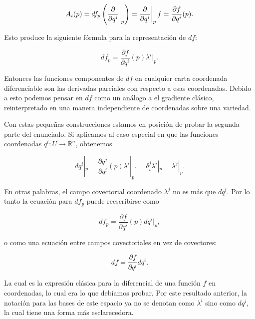 \documentclass[a4paper,10pt]{article}
\numberwithin{equation}{section}
\newcommand{\zerodel}{.\kern-\nulldelimiterspace}
\begin{document}
\begin{equation}
 A_i(p) = df_p\left( \left\zerodel \frac{\partial}{\partial q^i}\right|_p \right) = 
  \left\zerodel \frac{\partial}{\partial q^i}\right|_p f = \frac{\partial f}{\partial q^i}(p).
\end{equation}

Esto produce la siguiente fórmula para la representación de $df$:

\begin{equation}
 df_p = \frac{\partial f}{\partial q^i}(p) \lambda^i|_p.
 \label{eq:diferencial1}
\end{equation}

Entonces las funciones componentes de $df$ en cualquier carta coordenada diferenciable 
son las derivadas parciales con respecto a esas coordenadas. Debido a esto podemos 
pensar en $df$ como un análogo a el gradiente clásico, reinterpretado en una manera 
independiente de coordenadas sobre una variedad.

\vspace{.3cm}

Con estas pequeñas construcciones estamos en posición de probar la segunda parte 
del enunciado. Si aplicamos  al caso especial en que las 
funciones coordenadas $q^i: U \rightarrow \mathbb{R}^n$, obtenemos 

\begin{equation}
 dq^i|_p = \frac{\partial q^j}{\partial q^i}(p) \lambda^i|_p. = 
 \delta^j_i \lambda^i|_p = \lambda^j|_p.
\end{equation}

En otras palabras, el campo covectorial coordenado $\lambda^j$ no es más que 
$dq^i$. Por lo tanto la ecuación  para $df_p$ puede 
reescribirse como 

\begin{equation}
 df_p = \frac{\partial f}{\partial q^i}(p) dq^i|_p,
\end{equation}

o como una ecuación entre campos covectoriales en vez de covectores: 

\begin{equation}
 df = \frac{\partial f}{\partial q^i}dq^i.
\end{equation}

La cual es la expresión clásica para la diferencial de una función $f$ en coordenadas, 
lo cual era lo que debíamos probar. Por este resultado anterior, la notación para 
las bases de este espacio ya no se denotan como $\lambda^i$ sino como $dq^i$, la cual 
tiene una forma más esclarecedora.
\end{document}
